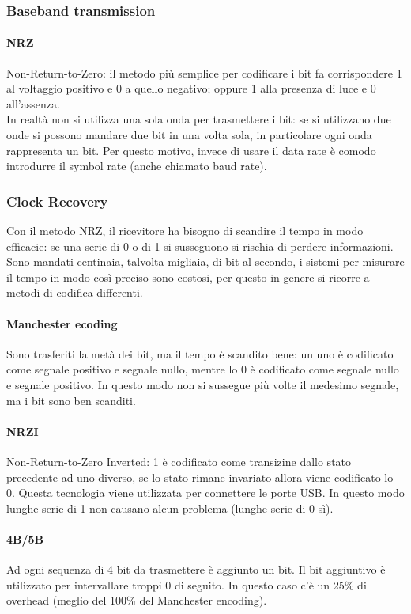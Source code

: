 \documentclass{article}
\begin{document}
\subsubsection{Baseband transmission}
\paragraph{NRZ} Non-Return-to-Zero: il metodo più semplice per codificare i bit
fa corrispondere 1 al voltaggio positivo e 0 a quello negativo; oppure 1 alla
presenza di luce e 0 all'assenza.\\
In realtà non si utilizza una sola onda per trasmettere i bit: se si utilizzano
due onde si possono mandare due bit in una volta sola, in particolare ogni onda
rappresenta un bit. Per questo motivo, invece di usare il data rate è comodo
introdurre il symbol rate (anche chiamato baud rate).

\subsubsection{Clock Recovery} Con il metodo NRZ, il ricevitore ha bisogno di
scandire il tempo in modo efficacie: se una serie di 0 o di 1 si susseguono si
rischia di perdere informazioni. Sono mandati centinaia, talvolta migliaia, di
bit al secondo, i sistemi per misurare il tempo in modo così preciso sono
costosi, per questo in genere si ricorre a metodi di codifica differenti.

\paragraph{Manchester ecoding} Sono trasferiti la metà dei bit, ma il tempo è
scandito bene: un uno è codificato come segnale positivo e segnale nullo, mentre
lo 0 è codificato come segnale nullo e segnale positivo. In questo modo non si
sussegue più volte il medesimo segnale, ma i bit sono ben scanditi.

\paragraph{NRZI} Non-Return-to-Zero Inverted: 1 è codificato come transizine
dallo stato precedente ad uno diverso, se lo stato rimane invariato allora viene
codificato lo 0. Questa tecnologia viene utilizzata per connettere le porte USB.
In questo modo lunghe serie di 1 non causano alcun problema (lunghe serie di 0
sì).

\paragraph{4B/5B} Ad ogni sequenza di 4 bit da trasmettere è aggiunto un bit. Il
bit aggiuntivo è utilizzato per intervallare troppi 0 di seguito. In questo caso
c'è un 25\% di overhead (meglio del 100\% del Manchester encoding).
\end{document}
